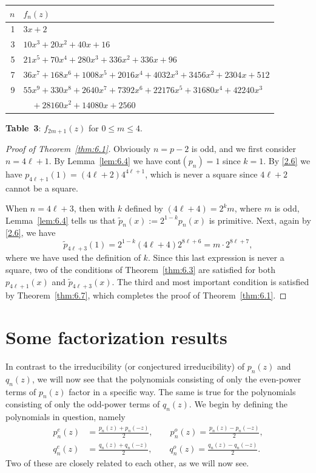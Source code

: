 \documentclass{amsart}
\theoremstyle{plain}
\numberwithin{equation}{section}
\begin{document}
\medskip
\begin{center}
{\renewcommand{\arraystretch}{1.1}
\begin{tabular}{|r|l|}
\hline
$n$ & $f_n(z)$ \\
\hline
1 & $3x+2$ \\
3 & $10x^3 + 20x^2 + 40x + 16$ \\
5 & $21x^5 + 70x^4 + 280x^3 + 336x^2 + 336x + 96$  \\
7 & $36x^7 + 168x^6 + 1008x^5 + 2016x^4 + 4032x^3 + 3456x^2 + 2304x + 512$  \\
9 & $55x^9 + 330x^8 + 2640x^7 + 7392x^6 + 22176x^5 + 31680x^4 + 42240x^3$ \\
& $\quad+ 28160x^2 + 14080x + 2560$  \\
\hline
\end{tabular}}

\medskip
{\bf Table~3}: $f_{2m+1}(z)$ for $0\leq m\leq 4$.
\end{center}


\begin{proof}[Proof of Theorem~\ref{thm:6.1}]
Obviously $n=p-2$ is odd, and we first consider $n=4\ell+1$. By
Lemma~\ref{lem:6.4} we have cont$(p_n)=1$ since $k=1$. By \eqref{2.6} we
have $p_{4\ell+1}(1)=(4\ell+2) 4^{4\ell+1}$, which is never a square since
$4\ell+2$ cannot be a square.

When $n=4\ell+3$, then with $k$ defined by $(4\ell+4)=2^km$, where $m$ is odd,
Lemma~\ref{lem:6.4} tells us that $\widetilde{p}_n(x):=2^{1-k}p_n(x)$ is
primitive. Next, again by \eqref{2.6}, we have
\[
\widetilde{p}_{4\ell+3}(1)=2^{1-k}(4\ell+4)2^{8\ell+6}=m\cdot 2^{8\ell+7},
\]
where we have used the definition of $k$. Since this last expression is never
a square, two of the conditions of Theorem~\ref{thm:6.3} are satisfied for
both $p_{4\ell+1}(x)$ and $\widetilde{p}_{4\ell+3}(x)$. The third and most
important condition is satisfied by Theorem~\ref{thm:6.7}, which completes the
proof of Theorem~\ref{thm:6.1}.
\end{proof}

\section{Some factorization results}

In contrast to the irreducibility (or conjectured irreducibility) of $p_n(z)$
and $q_n(z)$, we will now see that the polynomials consisting of only the
even-power terms of $p_n(z)$ factor in a specific way. The same is true for
the polynomials consisting of only the odd-power terms of $q_n(z)$. We begin
by defining the polynomials in question, namely
\begin{align*}
p_n^e(z)&=\frac{p_n(z)+p_n(-z)}{2},\qquad p_n^o(z)=\frac{p_n(z)-p_n(-z)}{2},\\
q_n^e(z)&=\frac{q_n(z)+q_n(-z)}{2},\qquad q_n^o(z)=\frac{q_n(z)-q_n(-z)}{2}.
\end{align*}
Two of these are closely related to each other, as we will now see.
\end{document}
